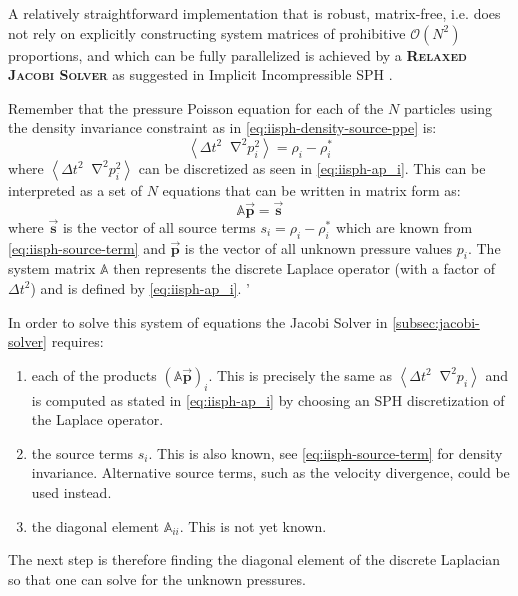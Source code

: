 \documentclass[oneside, a4paper]{book}
\newcommand\emphasis[1]{{\scshape\bfseries#1}}
\newcommand\angled[1]{\left\langle#1\right\rangle}
\newcommand*\Laplace{\mathop{}\!\mathbin\nabla^2}
\newcommand\vek[1]{\vec{\bm{#1}}}
\newcommand\br[1]{\left(#1\right)}
\begin{document}
    A relatively straightforward implementation that is robust, matrix-free, i.e. does not rely on explicitly constructing system matrices of prohibitive $\mathcal{O}\br{N^2}$ proportions, and which can be fully parallelized is achieved by a \emphasis{Relaxed Jacobi Solver} as suggested in Implicit Incompressible SPH \autocite[by Ihmsen et al.]{iisph}. 

    Remember that the pressure Poisson equation for each of the $N$ particles using the density invariance constraint as in \autoref{eq:iisph-density-source-ppe} is:
    \begin{equation}
      \angled{\Delta t^2 \Laplace p_i^2} = \rho_i-\rho_i^*
    \end{equation}
    where $\angled{\Delta t^2 \Laplace p_i^2}$ can be discretized as seen in \autoref{eq:iisph-ap_i}. This can be interpreted as a set of $N$ equations that can be written in matrix form as:
    \begin{equation}
      \mathds{A}\vek{p} = \vek{s}
    \end{equation}
    where $\vek{s}$ is the vector of all source terms $s_i= \rho_i-\rho_i^*$ which are known from \autoref{eq:iisph-source-term} and $\vek{p}$ is the vector of all unknown pressure values $p_i$. The system matrix $\mathds{A}$ then represents the discrete Laplace operator (with a factor of $\Delta t^2$) and is defined by \autoref{eq:iisph-ap_i}. '
    
    In order to solve this system of equations the Jacobi Solver in \autoref{subsec:jacobi-solver} requires:
    \begin{enumerate}
      \item each of the products $\br{\mathds{A}\vek{p}}_i$. This is precisely the same as $\angled{\Delta t^2\Laplace p_i}$ and is computed as stated in \autoref{eq:iisph-ap_i} by choosing an SPH discretization of the Laplace operator.
      \item the source terms $s_i$. This is also known, see \autoref{eq:iisph-source-term} for density invariance. Alternative source terms, such as the velocity divergence, could be used instead.
      \item the diagonal element $\mathds{A}_{ii}$. This is not yet known.
    \end{enumerate}
    The next step is therefore finding the diagonal element of the discrete Laplacian so that one can solve for the unknown pressures.
\end{document}
